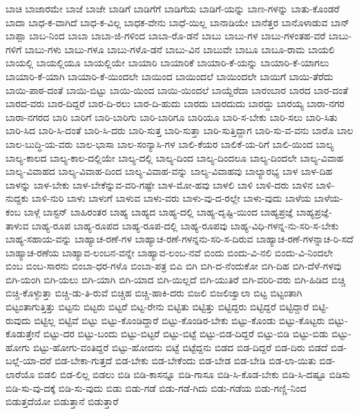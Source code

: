 ಬಾಚಿ
ಬಾಜಾರಮೇ
ಬಾಜೆ
ಬಾಜೇ
ಬಾಡಿಗೆ
ಬಾಡಿಗೆಗೆ
ಬಾಡಿಗೆಯ
ಬಾಡಿಗೆ-ಯನ್ನು
ಬಾಣ-ಗಳನ್ನು
ಬಾತು-ಕೊಂಡರೆ
ಬಾದಾ
ಬಾಧ-ಕ-ವಾಗಿದೆ
ಬಾಧ-ಕ-ವಿಲ್ಲ
ಬಾಧಕ-ವೇನು
ಬಾಧೆ-ಯಿಲ್ಲ
ಬಾನಾಡಿಯೇ
ಬಾನೆತ್ತರ
ಬಾನೊಳಾಡುವ
ಬಾನ್
ಬಾಪ್ಪಾ
ಬಾಬ-ನಿಂದ
ಬಾಬಾ
ಬಾಬಾ-ಜಿ-ಗಳಿಂದ
ಬಾಬಾ-ರೊ-ಡನೆ
ಬಾಬು
ಬಾಬು-ಗಳ
ಬಾಬು-ಗಳಂತಹ-ವರೆ
ಬಾಬು-ಗಳಿಗೆ
ಬಾಬು-ಗಳು
ಬಾಬು-ಗಳೂ
ಬಾಬು-ಗಳೊ-ಡನೆ
ಬಾಬು-ವಿನ
ಬಾಬುವೇ
ಬಾಬೂ
ಬಾಬೂ-ರಾಮ
ಬಾಯಲಿ
ಬಾಯಲ್ಲಿ
ಬಾಯಲ್ಲಿಯೂ
ಬಾಯಲ್ಲಿಯೇ
ಬಾಯಾರಿ
ಬಾಯಾರಿಕೆ
ಬಾಯಾರಿ-ಕೆ-ಯನ್ನು
ಬಾಯಾರಿ-ಕೆ-ಯಾಗಲು
ಬಾಯಾರಿ-ಕೆ-ಯಾಗಿ
ಬಾಯಾರಿ-ಕೆ-ಯಿಂದಲೇ
ಬಾಯಿಂದ
ಬಾಯಿಂದಲೆ
ಬಾಯಿಂದಲೇ
ಬಾಯಿಗೆ
ಬಾಯಿ-ತೆರೆದು
ಬಾಯಿ-ಪಾಠ-ದಂತೆ
ಬಾಯಿ-ಬಿಟ್ಟು
ಬಾಯಿ-ಯಿಂದ
ಬಾಯಿ-ಯಿಂದಲೆ
ಬಾಯ್ದೆರೆದಾ
ಬಾರಂಬಾರ
ಬಾರದ
ಬಾರ-ದಂತೆ
ಬಾರದ-ವರು
ಬಾರ-ದಿದ್ದರೆ
ಬಾರ-ದಿ-ರಲು
ಬಾರ-ದಿ-ಹುದು
ಬಾರದು
ಬಾರದುದು
ಬಾರದ್ದು
ಬಾರಯ್ಯ
ಬಾರಾ-ನಗರ
ಬಾರಾ-ನಗರದ
ಬಾರಿ
ಬಾರಿಗೆ
ಬಾರಿ-ಬಾರಿಗು
ಬಾರಿ-ಬಾರಿಗೂ
ಬಾರಿಯೂ
ಬಾರಿ-ಸ-ಬೇಕು
ಬಾರಿ-ಸಲು
ಬಾರಿ-ಸಿತು
ಬಾರಿ-ಸಿದ
ಬಾರಿ-ಸಿ-ದಂತೆ
ಬಾರಿ-ಸಿ-ದರು
ಬಾರಿ-ಸುತ್ತ
ಬಾರಿ-ಸುತ್ತಾ
ಬಾರಿ-ಸುತ್ತಿದ್ದಾಗ
ಬಾರಿ-ಸು-ವ-ವನು
ಬಾರೊ
ಬಾಲ
ಬಾಲ-ಬುದ್ಧಿ-ಯ-ವರು
ಬಾಲ-ಭಾಸಾ
ಬಾಲ-ಸಂನ್ಯಾಸಿ-ಗಳ
ಬಾಲಿ-ಕೆಯರ
ಬಾಲಿಕೆ-ಯ-ರಿಗೆ
ಬಾಲಿ-ಯಿಂದ
ಬಾಲ್ಯ
ಬಾಲ್ಯ-ಕಾಲದ
ಬಾಲ್ಯ-ಕಾಲ-ದಲ್ಲಿಯೇ
ಬಾಲ್ಯ-ದಲ್ಲಿ
ಬಾಲ್ಯ-ದಿಂದ
ಬಾಲ್ಯ-ದಿಂದಲೂ
ಬಾಲ್ಯ-ದಿಂದಲೇ
ಬಾಲ್ಯ-ವಿವಾಹ
ಬಾಲ್ಯ-ವಿವಾಹದ
ಬಾಲ್ಯ-ವಿವಾಹ-ದಿಂದ
ಬಾಲ್ಯ-ವಿವಾಹ-ವನ್ನು
ಬಾಲ್ಯ-ವಿವಾಹವು
ಬಾಲ್ಯಾರಭ್ಯ
ಬಾಳ
ಬಾಳ-ದಿಹ
ಬಾಳನ್ನು
ಬಾಳ-ಬೇಕು
ಬಾಳ-ಬೇಕೆನ್ನುವ-ವರಿ-ಗಷ್ಟೇ
ಬಾಳ-ಮೋ-ಹವು
ಬಾಳಲಿ
ಬಾಳಿ
ಬಾಳಿ-ದರು
ಬಾಳಿನ
ಬಾಳಿ-ನುದ್ದಕು
ಬಾಳಿ-ನುರಿ
ಬಾಳು
ಬಾಳುಗೆ
ಬಾಳುವ
ಬಾಳು-ವರು
ಬಾಳು-ವು-ದ-ರಲ್ಲೇ
ಬಾಳು-ವುದು
ಬಾಳೆಯ
ಬಾಳೆಯ-ಕಂಬ
ಬಾಳ್ಗೆ
ಬಾಸ್ಟನ್
ಬಾಹಿರಂತರ
ಬಾಹ್ಯ
ಬಾಹ್ಯದ
ಬಾಹ್ಯ-ದಲ್ಲಿ
ಬಾಹ್ಯ-ದೃಷ್ಟಿ-ಯಿಂದ
ಬಾಹ್ಯಪ್ರಜ್ಞೆ
ಬಾಹ್ಯಪ್ರಜ್ಞೆ-ತಾಳುವ
ಬಾಹ್ಯ-ರೂಪ
ಬಾಹ್ಯ-ರೂಪದ
ಬಾಹ್ಯ-ರೂಪ-ದಲ್ಲಿ
ಬಾಹ್ಯ-ರೂಪವು
ಬಾಹ್ಯ-ವಿಧಿ-ಗಳನ್ನ-ನು-ಸರಿ-ಸ-ಬೇಕು
ಬಾಹ್ಯ-ಸಹಾಯ-ವನ್ನು
ಬಾಹ್ಯಾಚ-ರಣೆ-ಗಳ
ಬಾಹ್ಯಾಚ-ರಣೆ-ಗಳನ್ನನು-ಸರಿ-ಸ-ದಿರುವ
ಬಾಹ್ಯಾಚ-ರಣೆ-ಗಳನ್ನಾಚ-ರಿ-ಸದೆ
ಬಾಹ್ಯಾಚ-ರಣೆಯ
ಬಾಹ್ಯಾವ-ಲಂಬನ-ವನ್ನೇ
ಬಾಹ್ಯಾವ-ಲಂಬ-ನವೆ
ಬಿಂದು
ಬಿಂದು-ವಿ-ನಲಿ
ಬಿಂದು-ವಿ-ನಿಂದಲೇ
ಬಿಂಬ
ಬಿಂಬ-ಸಾರನು
ಬಿಂಬಾ-ಧರ-ಗಳೊ
ಬಿಂಬಾ-ಪತ್ರ
ಬಿಎ
ಬಿಗಿ
ಬಿಗಿ-ದ-ನೆಂದುಕೋ
ಬಿಗಿ-ದಿಹ
ಬಿಗಿ-ದೆಳೆ-ಗಳವು
ಬಿಗಿ-ಯಂಗಿ
ಬಿಗಿ-ಯಲು
ಬಿಗಿ-ಯಾಗಿ
ಬಿಗಿ-ಯಾದ
ಬಿಗಿ-ಯಿಲ್ಲದೆ
ಬಿಗಿ-ಯುತಿರೆ
ಬಿಗಿ-ವರಿರಿ-ವರು
ಬಿಗಿ-ಹಿಡಿದ
ಬಿಚ್ಚಿ
ಬಿಚ್ಚಿ-ಕೊಳ್ಳುತ್ತಾ
ಬಿಚ್ಚಿ-ಡು-ತಿ-ರುವೆ
ಬಿಚ್ಚಿಹ
ಬಿಚ್ಚಿ-ಹಾಕಿ-ದರು
ಬಿಜಲಿ
ಬಿಜಲಿಜ್ವಾಲಾ
ಬಿಟ್ಟ
ಬಿಟ್ಟಂತಾಗಿ
ಬಿಟ್ಟಂತಾಗುತ್ತಿತ್ತು
ಬಿಟ್ಟನು
ಬಿಟ್ಟರು
ಬಿಟ್ಟರೆ
ಬಿಟ್ಟ-ರೇನು
ಬಿಟ್ಟಿತು
ಬಿಟ್ಟಿತ್ತು
ಬಿಟ್ಟಿದ್ದರು
ಬಿಟ್ಟಿದ್ದರೆ
ಬಿಟ್ಟಿದ್ದಾರೆ
ಬಿಟ್ಟಿ-ರುವುದು
ಬಿಟ್ಟಿಲ್ಲ
ಬಿಟ್ಟಿವೆ
ಬಿಟ್ಟು
ಬಿಟ್ಟು-ಕೊಂಡಿದ್ದಾರೆ
ಬಿಟ್ಟು-ಕೊಂಡಿರ-ಬೇಕು
ಬಿಟ್ಟು-ಕೊಂಡು
ಬಿಟ್ಟು-ಕೊಟ್ಟರು
ಬಿಟ್ಟು-ಕೊಡುತ್ತೇನೆ
ಬಿಟ್ಟು-ದರ
ಬಿಟ್ಟು-ಬಂದು
ಬಿಟ್ಟು-ಬಿಟ್ಟರೆ
ಬಿಟ್ಟು-ಬಿಟ್ಟೆ
ಬಿಟ್ಟು-ಬಿಡ-ದಿದ್ದರೆ
ಬಿಟ್ಟು-ಬಿಡಿ
ಬಿಟ್ಟು-ಬಿಡು
ಬಿಟ್ಟು-ಹೋಗು
ಬಿಟ್ಟು-ಹೋಗು-ವಂತಿದ್ದರೆ
ಬಿಟ್ಟು-ಹೋದನು
ಬಿಟ್ಟೆ
ಬಿಟ್ಟೆದ್ದನು
ಬಿಡದ
ಬಿಡ-ದಿದ್ದರೆ
ಬಿಡ-ದಿರು
ಬಿಡದೆ
ಬಿಡ-ಬಲ್ಲೆ-ಯಾ-ದರೆ
ಬಿಡ-ಬೇಕಾ-ಗುತ್ತದೆ
ಬಿಡ-ಬೇಕು
ಬಿಡ-ಬೇಕೆಂದು
ಬಿಡ-ಬೇಡ
ಬಿಡ-ಬೇಡಿ
ಬಿಡ-ಲಾ-ಯಿತು
ಬಿಡ-ಲಾರೆಯೊ
ಬಿಡಲಿ
ಬಿಡ-ಲಿಲ್ಲ
ಬಿಡಲು
ಬಿಡಿ
ಬಿಡಿ-ಕಾಸನ್ನೂ
ಬಿಡಿ-ಗಾಸೂ
ಬಿಡಿ-ಸಿ-ಕೊಡ-ಬೇಕು
ಬಿಡಿ-ಸಿ-ದಷ್ಟೂ
ಬಿಡಿಸು
ಬಿಡಿ-ಸು-ವು-ದಕ್ಕೆ
ಬಿಡಿ-ಸು-ವುದು
ಬಿಡು
ಬಿಡು-ಗಡೆ
ಬಿಡು-ಗಡೆ-ಗಿದು
ಬಿಡು-ಗಡೆಯ
ಬಿಡು-ಗಣ್ಣಿ-ನಿಂದ
ಬಿಡುತ್ತದೆಯೋ
ಬಿಡುತ್ತಾನೆ
ಬಿಡುತ್ತಾರೆ
